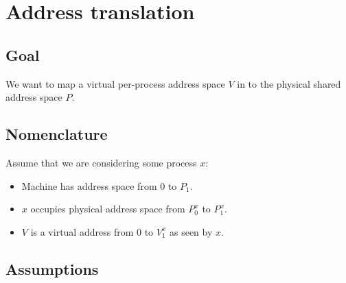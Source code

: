 \chapter{Address translation}
\label{ch:address-translation}



\section{Goal}

We want to map a virtual per-process address space $V$ in to the physical shared address space $P$.

\section{Nomenclature}

Assume that we are considering some process $x$: 

\begin{itemize}
\item Machine has address space from $0$ to $P_1$.
\item $x$ occupies physical address space from $P^x_0$ to $P^{x}_1$.
\item $V$ is a virtual address from $0$ to $V^x_1$ as seen by $x$.
\end{itemize}

\section{Assumptions}

